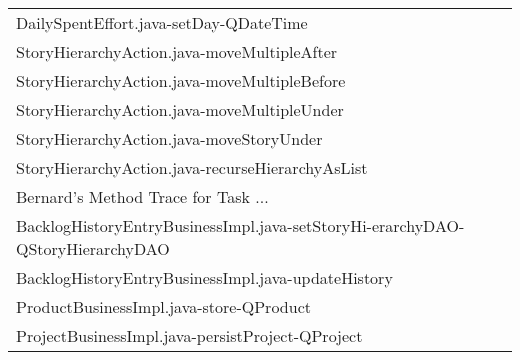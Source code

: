 \begin{table}[t!]
\begin{tabular}{@{\hspace{2pt}}l@{\hspace{2pt}}}
     DailySpentEffort.java-setDay-QDateTime                                                                                \\%
     StoryHierarchyAction.java-moveMultipleAfter                                                                                 \\%
     StoryHierarchyAction.java-moveMultipleBefore                                                                                \\%
     StoryHierarchyAction.java-moveMultipleUnder                                                                                 \\%
     StoryHierarchyAction.java-moveStoryUnder                                                                                    \\%
     StoryHierarchyAction.java-recurseHierarchyAsList                                                                            \\%
%
%
\midrule
\midrule
Bernard's Method Trace for Task ... \\%
 \midrule
     BacklogHistoryEntryBusinessImpl.java-setStoryHi-erarchyDAO-QStoryHierarchyDAO \\%
     BacklogHistoryEntryBusinessImpl.java-updateHistory                          \\%
     ProductBusinessImpl.java-store-QProduct                                    \\%
     ProjectBusinessImpl.java-persistProject-QProject                             \\%

\end{tabular}
\end{table}
